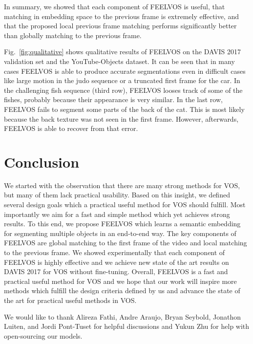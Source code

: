 \documentclass[10pt,twocolumn,letterpaper]{article}
\newcommand{\PAR}[1]{\vskip1pt \noindent {\bf #1~}}
\begin{document}
In summary, we showed that each component of FEELVOS is useful, that matching in embedding space to the previous frame is extremely effective, and that the proposed local previous frame matching performs significantly better than globally matching to the previous frame.

\PAR{Qualitative Results.}
Fig.~\ref{fig:qualitative} shows qualitative results of FEELVOS on the DAVIS 2017 validation set and the YouTube-Objects dataset. It can be seen that in many cases FEELVOS is able to produce accurate segmentations even in difficult cases like large motion in the judo sequence or a truncated first frame for the car. In the challenging fish sequence (third row), FEELVOS looses track of some of the fishes, probably because their appearance is very similar. In the last row, FEELVOS fails to segment some parts of the back of the cat. This is most likely because the back texture was not seen in the first frame. However, afterwards, FEELVOS is able to recover from that error.\vspace{-1pt}

\section{Conclusion}

We started with the observation that there are many strong methods for VOS, but many of them lack practical usability. Based on this insight, we defined several design goals which a practical useful method for VOS should fulfill. Most importantly we aim for a fast and simple method which yet achieves strong results. To this end, we propose FEELVOS which learns a semantic embedding for segmenting multiple objects in an end-to-end way. The key components of FEELVOS are global matching to the first frame of the video and local matching to the previous frame. We showed experimentally that each component of FEELVOS is highly effective and we achieve new state of the art results on DAVIS 2017 for VOS without fine-tuning. Overall, FEELVOS is a fast and practical useful method for VOS and we hope that our work will inspire more methods which fulfill the design criteria defined by us and advance the state of the art for practical useful methods in VOS.

\footnotesize \PAR{Acknowledgements:} We would like to thank Alireza Fathi, Andre Araujo, Bryan Seybold, Jonathon Luiten, and Jordi Pont-Tuset for helpful discussions and Yukun Zhu for help with open-sourcing our models.

{\small


}
\end{document}
